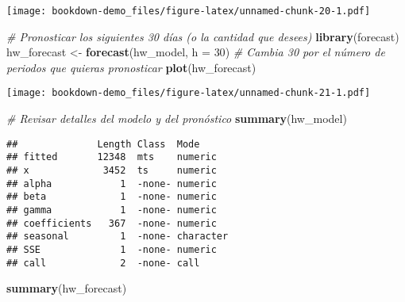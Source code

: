 \documentclass[
]{book}
\newenvironment{Shaded}{\begin{snugshade}}{\end{snugshade}}
\newcommand{\AttributeTok}[1]{\textcolor[rgb]{0.13,0.29,0.53}{#1}}
\newcommand{\CommentTok}[1]{\textcolor[rgb]{0.56,0.35,0.01}{\textit{#1}}}
\newcommand{\DecValTok}[1]{\textcolor[rgb]{0.00,0.00,0.81}{#1}}
\newcommand{\FunctionTok}[1]{\textcolor[rgb]{0.13,0.29,0.53}{\textbf{#1}}}
\newcommand{\NormalTok}[1]{#1}
\newcommand{\OtherTok}[1]{\textcolor[rgb]{0.56,0.35,0.01}{#1}}
\begin{document}
\texttt{[image: bookdown-demo\_files/figure-latex/unnamed-chunk-20-1.pdf]}

\begin{Shaded}
\begin{Highlighting}[]
\CommentTok{\# Pronosticar los siguientes 30 días (o la cantidad que desees)}
\FunctionTok{library}\NormalTok{(forecast)}
\NormalTok{hw\_forecast }\OtherTok{\textless{}{-}} \FunctionTok{forecast}\NormalTok{(hw\_model, }\AttributeTok{h =} \DecValTok{30}\NormalTok{)  }\CommentTok{\# Cambia 30 por el número de periodos que quieras pronosticar}
\FunctionTok{plot}\NormalTok{(hw\_forecast)}
\end{Highlighting}
\end{Shaded}

\texttt{[image: bookdown-demo\_files/figure-latex/unnamed-chunk-21-1.pdf]}

\begin{Shaded}
\begin{Highlighting}[]
\CommentTok{\# Revisar detalles del modelo y del pronóstico}
\FunctionTok{summary}\NormalTok{(hw\_model)}
\end{Highlighting}
\end{Shaded}

\begin{verbatim}
##              Length Class  Mode     
## fitted       12348  mts    numeric  
## x             3452  ts     numeric  
## alpha            1  -none- numeric  
## beta             1  -none- numeric  
## gamma            1  -none- numeric  
## coefficients   367  -none- numeric  
## seasonal         1  -none- character
## SSE              1  -none- numeric  
## call             2  -none- call
\end{verbatim}

\begin{Shaded}
\begin{Highlighting}[]
\FunctionTok{summary}\NormalTok{(hw\_forecast)}
\end{Highlighting}
\end{Shaded}
\end{document}
